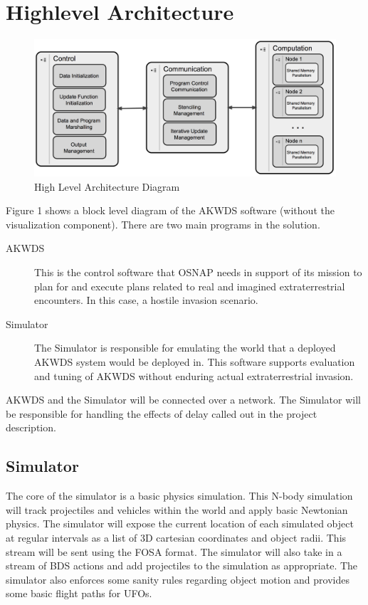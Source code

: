 \section{Highlevel Architecture}
\label{architecture}


\begin{figure}[h]
\begin{center}
\includegraphics[scale=0.4]{arch.png}
\caption{High Level Architecture Diagram}
\label{fig:arch}
\end{center}
\end{figure}


Figure 1 shows a block level diagram of the AKWDS software (without the visualization component). There are two main programs in the solution.
\begin{description}
\item[AKWDS] This is the control software that OSNAP needs in support of its mission to plan for and execute plans related to real and imagined extraterrestrial encounters. In this case, a hostile invasion scenario.
\item[Simulator] The Simulator is responsible for emulating the world that a deployed AKWDS system would be deployed in. This software supports evaluation and tuning of AKWDS without enduring actual extraterrestrial invasion.
\end{description}
AKWDS and the Simulator will be connected over a network. The Simulator will be responsible for handling the effects of delay called out in the project description.

\subsection{Simulator}
The core of the simulator is a basic physics simulation. This N-body simulation will track projectiles and vehicles within the world and apply basic Newtonian physics. The simulator will expose the current location of each simulated object at regular intervals as a list of 3D cartesian coordinates and object radii. This stream will be sent using the FOSA format. The simulator will also take in a stream of BDS actions and add projectiles to the simulation as appropriate. The simulator also enforces some sanity rules regarding object motion and provides some basic flight paths for UFOs.

